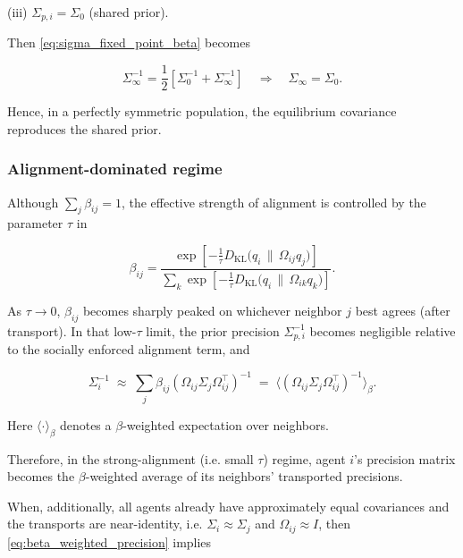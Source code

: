 \documentclass[twoside,11pt]{article}
\begin{document}
(iii) $\Sigma_{p,i} = \Sigma_0$ (shared prior).

Then \eqref{eq:sigma_fixed_point_beta} becomes

\begin{equation}
\Sigma_\infty^{-1}
=\frac{1}{2}
\left[
\Sigma_0^{-1}
+ \Sigma_\infty^{-1}
\right]
\quad\Longrightarrow\quad
\Sigma_\infty = \Sigma_0.
\end{equation}

Hence, in a perfectly symmetric population, the equilibrium covariance reproduces the shared prior.

\subsubsection{Alignment-dominated regime}

Although $\sum_j \beta_{ij} = 1$, the effective strength of alignment is controlled by the parameter $\tau$ in

\begin{equation}
\beta_{ij}
=\frac{
\exp\!\left[
-\frac{1}{\tau}
D_{\mathrm{KL}}\!\big(q_i \,\|\, \Omega_{ij} q_j\big)
\right]
}{\sum_k
\exp\!\left[
-\frac{1}{\tau}
D_{\mathrm{KL}}\!\big(q_i \,\|\, \Omega_{ik} q_k\big)
\right]}.
\end{equation}

As $\tau \to 0$, $\beta_{ij}$ becomes sharply peaked on whichever neighbor $j$ best agrees (after transport). In that low-$\tau$ limit, the prior precision $\Sigma_{p,i}^{-1}$ becomes negligible relative to the socially enforced alignment term, and

\begin{equation}
\boxed{
\Sigma_i^{-1}
\;\approx\;
\sum_j \beta_{ij}
(\Omega_{ij}\Sigma_j\Omega_{ij}^\top)^{-1}
\;=\;\big\langle(\Omega_{ij}\Sigma_j\Omega_{ij}^\top)^{-1}
\big\rangle_{\beta}.}
\label{eq:beta_weighted_precision}
\end{equation}

Here $\langle \cdot \rangle_{\beta}$ denotes a $\beta$-weighted expectation over neighbors.

Therefore, in the strong-alignment (i.e. small $\tau$) regime, agent $i$'s precision matrix becomes the $\beta$-weighted average of its neighbors' transported precisions.

When, additionally, all agents already have approximately equal covariances and the transports are near-identity, i.e. $\Sigma_i \approx \Sigma_j$ and $\Omega_{ij} \approx I$, then \eqref{eq:beta_weighted_precision} implies
\end{document}
